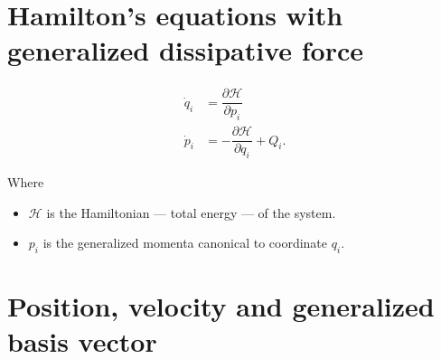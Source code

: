 \documentclass[12pt,a4paper,portrait]{article}
\newcommand{\ham}{\mathcal{H}}
\begin{document}
	\section{Hamilton's equations with generalized dissipative force}
	\begin{align*}
		\dot{q}_i &= \dfrac{\partial \ham}{\partial p_i} \\
		\dot{p}_i &= -\dfrac{\partial \ham}{\partial q_i} + Q_i.
	\end{align*}
	
	Where
	
	\begin{itemize}
		\item $\ham$ is the Hamiltonian --- total energy --- of the system. 
		\item $p_i$ is the generalized momenta canonical to coordinate $q_i$.
	\end{itemize}
	
	\section{Position, velocity and generalized basis vector}
\end{document}
